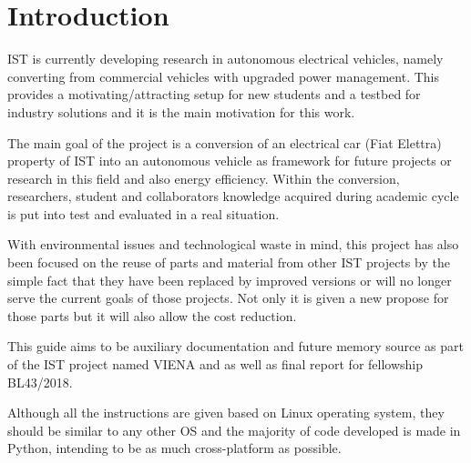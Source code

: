 
\chapter{Introduction}
\label{chapter:introduction}

\gls{IST} is currently developing research in autonomous electrical vehicles, namely converting from commercial vehicles with upgraded power management.
This provides a motivating/attracting setup for new students and a testbed for industry solutions and it is the main motivation for this work.

The main goal of the project is a conversion of an electrical car (Fiat Elettra) property of \gls{IST} into an autonomous vehicle as framework for future projects or research in this field and also energy efficiency. Within the conversion, researchers, student and collaborators knowledge acquired during academic cycle is put into test and evaluated in a real situation. 

With environmental issues and technological waste in mind, this project has
also been focused on the reuse of parts and material from
other \gls{IST} projects by the simple fact that they have been replaced by improved versions or will no longer serve the current goals of those projects. Not only it is given a new propose for those parts but it will also allow the cost reduction.

This guide aims to be auxiliary documentation and future memory source as part of the \gls{IST} project named \gls{VIENA} and as well as final report for fellowship BL43/2018. 

Although all the instructions are given based on Linux operating system, they should be similar to any other \gls{OS} and the majority of code developed is made in Python, intending to be as much cross-platform as possible.




